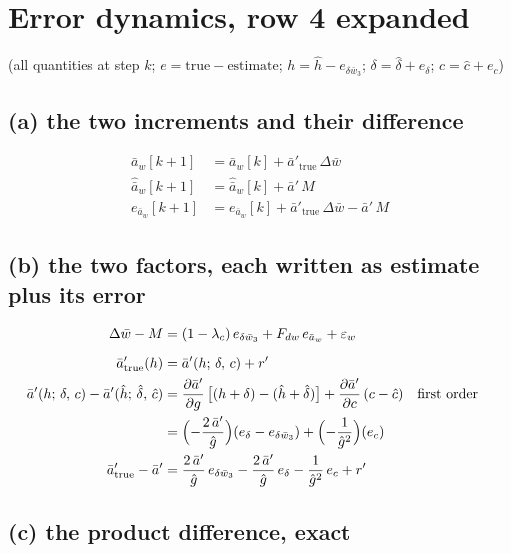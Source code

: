 \documentclass[11pt,a4paper,fontset=none]{ctexart}
\newcommand{\ba}{\bar{a}}
\newcommand{\bw}{\bar{w}}
\newcommand{\dW}{\Delta\bw}
\newcommand{\ap}{\ba'}
\newcommand{\ah}{\hat{\ba}_w}
\newcommand{\hh}{\hat{h}}
\newcommand{\ch}{\hat{c}}
\newcommand{\dl}{\delta}
\newcommand{\dlh}{\hat{\delta}}
\newcommand{\gs}{g}
\newcommand{\gh}{\hat{g}}
\begin{document}
\newpage
\section{Error dynamics, row 4 expanded}

(all quantities at step $k$; $e = \text{true} - \text{estimate}$; $h = \hh - e_{\delta\bw_3}$; $\dl = \dlh + e_{\dl}$; $c = \ch + e_c$)

\subsection*{(a) the two increments and their difference}

\begin{align*}
\ba_w[k+1]                    &= \ba_w[k] + \ap_{\mathrm{true}}\,\dW \\
\ah[k+1]                      &= \ah[k]   + \ap\,M \\
e_{\ba_w}[k+1]                &= e_{\ba_w}[k] + \ap_{\mathrm{true}}\,\dW - \ap\,M
\end{align*}

\subsection*{(b) the two factors, each written as estimate plus its error}

\begin{align*}
\dW - M                       &= (1-\lambda_c)\,e_{\delta\bw_3} + F_{dw}\,e_{\ba_w} + \varepsilon_w \\[6pt]
\ap_{\mathrm{true}}(h)        &= \ap(h;\,\dl,\,c) + r' \\
\ap(h;\,\dl,\,c) - \ap(\hh;\,\dlh,\,\ch)
                              &= \frac{\partial\ap}{\partial\gs}\,\bigl[(h + \dl) - (\hh + \dlh)\bigr] + \frac{\partial\ap}{\partial c}\,(c - \ch)
                                 && \text{first order} \\
                              &= \Bigl(-\frac{2\,\ap}{\gh}\Bigr)(e_{\dl} - e_{\delta\bw_3}) + \Bigl(-\frac{1}{\gh^{2}}\Bigr)(e_c) \\
\ap_{\mathrm{true}} - \ap     &= \frac{2\,\ap}{\gh}\,e_{\delta\bw_3} - \frac{2\,\ap}{\gh}\,e_{\dl} - \frac{1}{\gh^{2}}\,e_c + r'
\end{align*}

\subsection*{(c) the product difference, exact}
\end{document}
